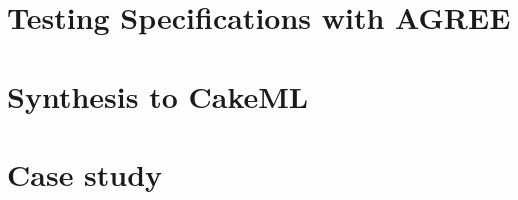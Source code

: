 \documentclass[global,twocolumn,keeplastbox]{svjour}
\newif\ifREVISIONS
\begin{document}
\section{Testing Specifications with AGREE}
\label{sec:testing}


\section{Synthesis to CakeML}
\label{sec:synthesis}


\ifREVISIONS
\subsection{Revisions}
\begin{compactitem}
  \item State theorem relating the step function to the meaning of the leaf-node semantics
\end{compactitem}
\fi

\section{Case study}
\label{sec:case-study}


\ifREVISIONS
\end{document}
